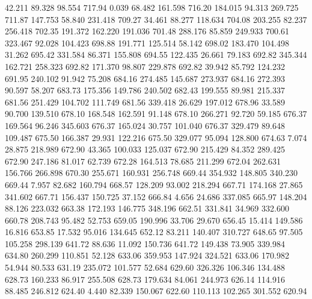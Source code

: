   42.211   89.328   98.554       717.94
   0.039   68.482  161.598       716.20
 184.015   94.313  269.725       711.87
 147.753   58.840  231.418       709.27
  34.461   88.277  118.634       704.08
 203.255   82.237  256.418       702.35
 191.372  162.220  191.036       701.48
 288.176   85.859  249.933       700.61
 323.467   92.028  104.423       698.88
 191.771  125.514   58.142       698.02
 183.470  104.498   31.262       695.42
 331.584   86.371  155.808       694.55
 122.435   26.661   79.183       692.82
 345.344  162.721  258.323       692.82
 171.370   98.807  229.878       692.82
  39.942   85.792  124.232       691.95
 240.102   91.942   75.208       684.16
 274.485  145.687  273.937       684.16
 272.393   90.597   58.207       683.73
 175.356  149.786  240.502       682.43
 199.555   89.981  215.337       681.56
 251.429  104.702  111.749       681.56
 339.418   26.629  197.012       678.96
  33.589   90.700  139.510       678.10
 168.548  162.591   91.148       678.10
 266.271   92.720   59.185       676.37
 169.564   96.246  345.603       676.37
 165.024   30.757  101.040       676.37
 329.479   89.648  109.487       675.50
 166.387   29.931  122.216       675.50
 329.077   95.094  128.800       674.63
   7.074   28.875  218.989       672.90
  43.365  100.033  125.037       672.90
 215.429   84.352  289.425       672.90
 247.186   81.017   62.739       672.28
 164.513   78.685  211.299       672.04
 262.631  156.766  266.898       670.30
 255.671  160.931  256.748       669.44
 354.932  148.805  340.230       669.44
   7.957   82.682  160.794       668.57
 128.209   93.002  218.294       667.71
 174.168   27.865  341.602       667.71
 156.437  150.725   37.152       666.84
   4.656   24.686  337.085       665.97
 148.204   88.126  223.032       663.38
 172.193  146.775  348.196       662.51
 331.841   34.969  332.600       660.78
 208.743   95.482   52.753       659.05
 190.996   33.706   29.670       656.45
  15.414  149.586   16.816       653.85
  17.532   95.016  134.645       652.12
  83.211  140.407  310.727       648.65
  97.505  105.258  298.139       641.72
  88.636   11.092  150.736       641.72
 149.438   73.905  339.984       634.80
 260.299  110.851   52.128       633.06
 359.953  147.924  324.521       633.06
 170.982   54.944   80.533       631.19
 235.072  101.577   52.684       629.60
 326.326  106.346  134.488       628.73
 160.233   86.917  255.508       628.73
 179.634   84.061  244.973       626.14
 114.916   88.485  246.812       624.40
   4.440   82.339  150.067       622.60
 110.113  102.265  301.552       620.94
